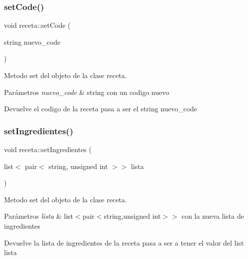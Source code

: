 \subsubsection{\texorpdfstring{set\+Code()}{setCode()}}
{\footnotesize\ttfamily void receta\+::set\+Code (\begin{DoxyParamCaption}\item[{string}]{nuevo\+\_\+code }\end{DoxyParamCaption})}



Metodo set del objeto de la clase receta. 


\begin{DoxyParams}{Parámetros}
{\em nuevo\+\_\+code} & string con un codigo nuevo \\
\hline
\end{DoxyParams}
\begin{DoxyReturn}{Devuelve}
el codigo de la receta pasa a ser el string nuevo\+\_\+code 
\end{DoxyReturn}
\mbox{\label{classreceta_a2f9ea189dd07209de681c5b000614722}} 
\subsubsection{\texorpdfstring{set\+Ingredientes()}{setIngredientes()}}
{\footnotesize\ttfamily void receta\+::set\+Ingredientes (\begin{DoxyParamCaption}\item[{list$<$ pair$<$ string, unsigned int $>$$>$}]{lista }\end{DoxyParamCaption})}



Metodo set del objeto de la clase receta. 


\begin{DoxyParams}{Parámetros}
{\em lista} & list$<$pair$<$string,unsigned int$>$$>$ con la nueva lista de ingredientes \\
\hline
\end{DoxyParams}
\begin{DoxyReturn}{Devuelve}
la lista de ingredientes de la receta pasa a ser a tener el valor del list lista 
\end{DoxyReturn}
\mbox{\label{classreceta_a2ab0262c83972b246c725ef12fb72243}} 
